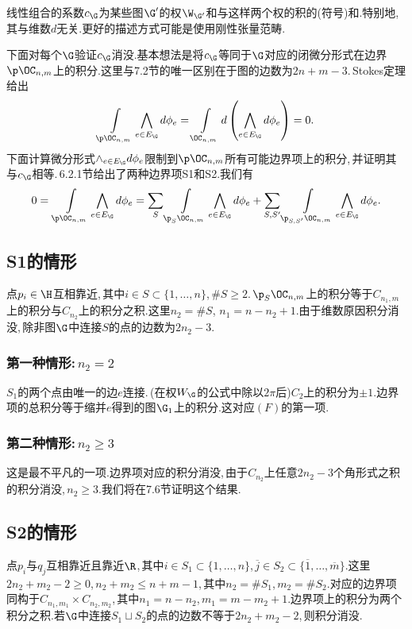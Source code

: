 线性组合的系数$c_\G$为某些图$\G'$的权$\W_{\G'}$和与这样两个权的积的(符号)和.特别地,\,其与维数$d$无关.更好的描述方式可能是使用刚性张量范畴.

下面对每个$\G$验证$c_\G$消没.基本想法是将$c_\G$等同于$\G$对应的闭微分形式在边界$\p \OC_{n,m}$上的积分.这里与7.2节的唯一区别在于图的边数为$2n+m-3$.\,Stokes定理给出
$$
     \int\limits_{\p \OC_{n,m}}\bigwedge_{e\in E_\G}d\phi_e
     =\int\limits_{\OC_{n,m}}d\left(\bigwedge_{e\in E_\G}d\phi_e\right)
     =0.$$
下面计算微分形式$\wedge_{e\in E_\G}d\phi_e$限制到$\p \OC_{n,m}$所有可能边界项上的积分,\,并证明其与$c_\G$相等.\,6.2.1节给出了两种边界项S1和S2.我们有
$$0=\,\int\limits_{\p \OC_{n,m}}\bigwedge_{e\in E_\G}d\phi_e
      =\sum_{S}  \int\limits_{\p_S \OC_{n,m}}\bigwedge_{e\in E_\G}d\phi_e
      + \sum_{S, S'}  \int\limits_{\p_{S,S'}
       \OC_{n,m}}\bigwedge_{e\in E_\G}d\phi_e.$$



\subsection{S1的情形}
点$p_i\in\H$互相靠近,\,其中$i\in S\subset\{1,\dots,n\}$,\,$\#S\ge 2$.\,$\p_S \OC_{n,m}$上的积分等于$C_{n_1,m}$上的积分与$C_{n_2}$上的积分之积.这里$n_2=\#S$,\,\,$n_1=n-n_2+1$.由于维数原因积分消没,\,除非图$\G$中连接$S$的点的边数为$2n_2-3$.

\subsubsection{第一种情形:\,$n_2=2$}
$S_1$的两个点由唯一的边$e$连接.\,(在权$W_{\G}$的公式中除以$2\pi$后)$C_2$上的积分为$\pm 1$.边界项的总积分等于缩并$e$得到的图$\G_1$上的积分.这对应$(F)$的第一项.

\subsubsection{第二种情形:\,$n_2\ge 3$}
这是最不平凡的一项.边界项对应的积分消没,\,由于$C_{n_2}$上任意$2n_2-3$个角形式之积的积分消没,\,$n_2\ge 3$.我们将在7.6节证明这个结果.

\subsection{S2的情形}
点$p_i$与$q_j$互相靠近且靠近$\R$,\,其中$i\in S_1\subset\{1,\dots,n\}$,\,${\overline j}\in S_2\subset\{{\overline 1},\dots,{\overline m}\}$.这里$2n_2+m_2-2\ge 0$,\,$n_2+m_2\le n+m-1$,\,其中$n_2=\#S_1$,\,$m_2=\#S_2$.对应的边界项同构于$C_{n_1,m_1}\times C_{n_2,m_2}$,\,其中$n_1=n-n_2$,\,$m_1=m-m_2+1$.边界项上的积分为两个积分之积.若$\G$中连接$S_1\sqcup S_2$的点的边数不等于$2n_2+m_2-2$,\,则积分消没.

